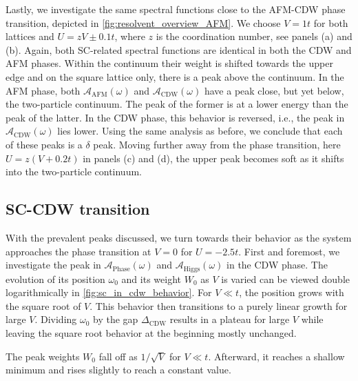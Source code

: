 \documentclass[
    reprint, 
    aps,
    preprintnumbers,
    twocolumn,
    prb,
    superscriptaddress
]{revtex4-2}
\newcommand{\spectral}[1]{\mathcal{A}_\text{#1}  (\omega)}
\begin{document}
Lastly, we investigate the same spectral functions close to the AFM-CDW phase transition, depicted in \autoref{fig:resolvent_overview_AFM}.
We choose $V=1t$ for both lattices and $U=zV \pm 0.1t$, where $z$ is the coordination number, see panels (a) and (b).
Again, both SC-related spectral functions are identical in both the CDW and AFM phases.
Within the continuum their weight is shifted towards the upper edge and on the square lattice only, there is a peak above the continuum.
In the AFM phase, both $\spectral{AFM}$ and $\spectral{CDW}$ have a peak close, but yet below, the two-particle continuum.
The peak of the former is at a lower energy than the peak of the latter.
In the CDW phase, this behavior is reversed, i.e., the peak in $\spectral{CDW}$ lies lower.
Using the same analysis as before, we conclude that each of these peaks is a $\delta$ peak.
Moving further away from the phase transition, here $U=z(V+0.2t)$ in panels (c) and (d), the upper peak becomes soft as it shifts into the two-particle continuum. 



\subsection{SC-CDW transition}

With the prevalent peaks discussed, we turn towards their behavior as the system approaches the phase transition at $V=0$ for $U=-2.5t$.
First and foremost, we investigate the peak in $\spectral{Phase}$ and $\spectral{Higgs}$ in the CDW phase.
The evolution of its position $\omega_0$ and its weight $W_0$ as $V$ is varied can be viewed double logarithmically in \autoref{fig:sc_in_cdw_behavior}.
For $V \ll t$, the position grows with the square root of $V$. This behavior then transitions to a purely linear growth for large $V$.
Dividing $\omega_0$ by the gap $\Delta_\text{CDW}$ results in a plateau for large $V$ while leaving the square root behavior at the beginning mostly unchanged.

The peak weights $W_0$ fall off as $1/\sqrt{V}$ for $V \ll t$. 
Afterward, it reaches a shallow minimum and rises slightly to reach a constant value.
\end{document}
